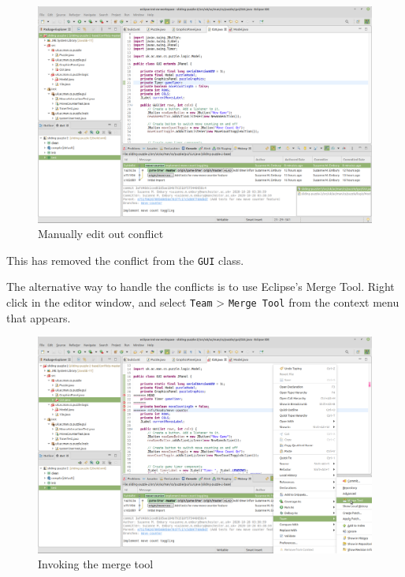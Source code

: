\documentclass[
]{book}
\begin{document}
\begin{figure}

{\centering \includegraphics[width=1\linewidth]{images/manuallyEditOutConflict} 

}

\caption{Manually edit out conflict}\label{fig:manuallyEditOutConflict-fig}
\end{figure}

This has removed the conflict from the \texttt{GUI} class.

The alternative way to handle the conflicts is to use Eclipse's Merge Tool. Right click in the editor window, and select \texttt{Team} \textgreater{} \texttt{Merge\ Tool} from the context menu that appears.

\begin{figure}

{\centering \includegraphics[width=1\linewidth]{images/invokingTheMergeTool} 

}

\caption{Invoking the merge tool}\label{fig:invokingTheMergeTool-fig}
\end{figure}
\end{document}
